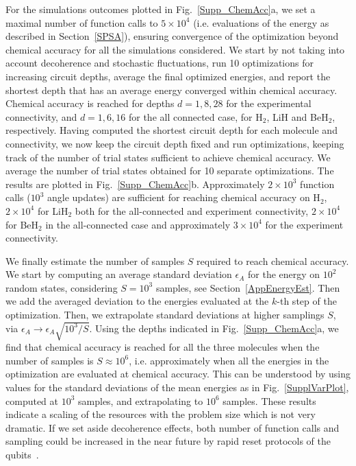 \documentclass[twocolumn]{revtex4-1}
\newcommand{\1}{\mathbbm{1}}
\begin{document}
For the simulations outcomes plotted in Fig.~\ref{Supp_ChemAcc}a, we set a maximal number of function calls to $5\times 10^4$ (i.e. evaluations of the energy as described in Section~\ref{SPSA}), ensuring convergence of the optimization beyond chemical accuracy for all the simulations considered. We start by not taking into account decoherence and stochastic fluctuations, run 10 optimizations for increasing circuit depths, average the final optimized energies, and report the shortest depth that has an average energy converged within chemical accuracy. Chemical accuracy is reached for depths $d=1,8,28$ for the experimental connectivity,  and $d=1,6,16$ for the all connected case, for H$_2$, LiH and BeH$_2$, respectively.
Having computed the shortest circuit depth for each molecule and connectivity, we now keep the circuit depth fixed and run optimizations, keeping track of the number of trial states sufficient to achieve chemical accuracy. We average the number of trial states obtained for 10 separate optimizations. The results are plotted in Fig.~\ref{Supp_ChemAcc}b. Approximately $2\times 10^3$ function calls ($10^3$ angle updates) are sufficient for reaching chemical accuracy on H$_2$, $2\times 10^4$ for LiH$_2$ both for the all-connected and experiment connectivity, $2\times 10^4$ for BeH$_2$ in the all-connected case and approximately $3\times10^4$ for the experiment connectivity. 

We finally estimate the number of samples $S$ required to reach chemical accuracy. We start by computing an average standard deviation $\epsilon_A$ for the energy on $10^2$ random states, considering $S=10^3$ samples, see Section~\ref{AppEnergyEst}. Then we add the averaged deviation to the energies evaluated at the $k$-th step of the optimization. Then, we extrapolate standard deviations at higher samplings $S$, via $\epsilon_A\rightarrow\epsilon_A\sqrt{10^3/S}$. Using the depths indicated in Fig.~\ref{Supp_ChemAcc}a, we find that chemical accuracy is reached for all the three molecules when the number of samples is $S\approx 10^6$, i.e. approximately when all the energies in the optimization are evaluated at chemical accuracy. This can be understood by using values for the standard deviations of the mean energies as in Fig.~\ref{SupplVarPlot}, computed at $10^3$ samples, and extrapolating to $10^6$ samples.  
These results indicate a scaling of the resources with the problem size which is not very dramatic. If we set aside decoherence effects, both number of function calls and sampling could be increased in the near future by rapid reset protocols of the qubits~\cite{Riste2012S,ResetS,Bultnick2016S}. 
\end{document}
